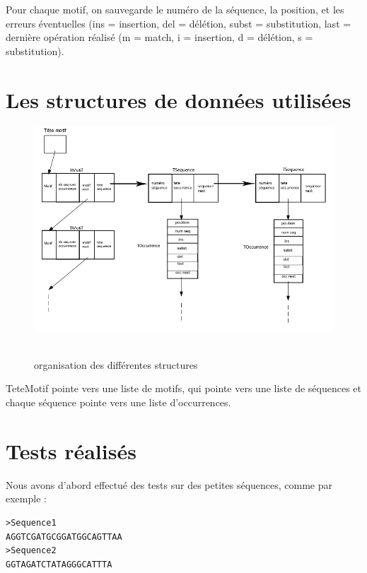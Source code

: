 \documentclass[a4paper,12pt]{article}
\begin{document}
Pour chaque motif, on sauvegarde le numéro de la séquence, la position, et les erreurs éventuelles (ins = insertion, del = délétion, subst = substitution, last = dernière opération réalisé (m = match, i = insertion, d = délétion, s = substitution). 
\newpage
\section{Les structures de données utilisées}
\begin{figure}[!h]
\includegraphics[scale=0.6]{structureDeDonnees.png}~
\caption{organisation des différentes structures}
\end{figure}
TeteMotif pointe vers une liste de motifs, qui pointe vers une liste de séquences et chaque séquence pointe vers une liste d'occurrences.

\section{Tests réalisés}

Nous avons d'abord effectué des tests sur des petites séquences, comme par exemple : 

\begin{lstlisting}
>Sequence1
AGGTCGATGCGGATGGCAGTTAA
>Sequence2
GGTAGATCTATAGGGCATTTA
\end{lstlisting}
\end{document}
